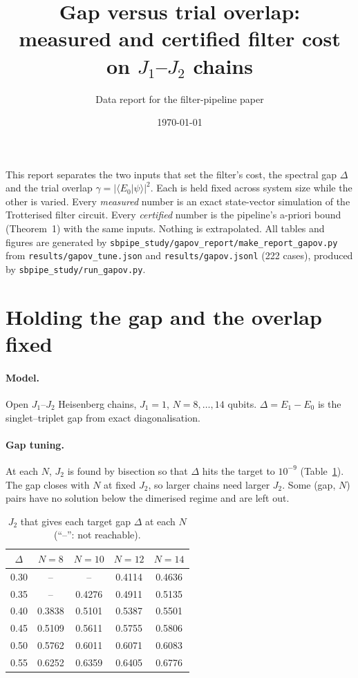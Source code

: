 \documentclass[10pt]{article}
\title{Gap versus trial overlap:\\ measured and certified filter cost on $J_1$--$J_2$ chains}
\author{Data report for the filter-pipeline paper}
\date{\today}
\begin{document}
\maketitle

\noindent This report separates the two inputs that set the filter's cost, the spectral gap $\Delta$ and the trial
overlap $\gamma=|\langle E_0|\psi\rangle|^2$. Each is held fixed across system size while the other is varied.
Every \emph{measured} number is an exact state-vector simulation of the Trotterised filter circuit. Every
\emph{certified} number is the pipeline's a-priori bound (Theorem~1) with the same inputs. Nothing is
extrapolated. All tables and figures are generated by \texttt{sbpipe\_study/gapov\_report/make\_report\_gapov.py}
from \texttt{results/gapov\_tune.json} and \texttt{results/gapov.jsonl} (222 cases), produced by
\texttt{sbpipe\_study/run\_gapov.py}.

\section{Holding the gap and the overlap fixed}

\paragraph{Model.} Open $J_1$--$J_2$ Heisenberg chains, $J_1=1$, $N=8,\dots,14$ qubits.
$\Delta=E_1-E_0$ is the singlet--triplet gap from exact diagonalisation.

\paragraph{Gap tuning.} At each $N$, $J_2$ is found by bisection so that $\Delta$ hits the target to $10^{-9}$
(Table~\ref{tab:tune}). The gap closes with $N$ at fixed $J_2$, so larger chains need larger $J_2$. Some
(gap, $N$) pairs have no solution below the dimerised regime and are left out.

\begin{table}[h]\centering\small
\caption{$J_2$ that gives each target gap $\Delta$ at each $N$ (``--'': not reachable).}\label{tab:tune}
\begin{tabular}{ccccc}\toprule
$\Delta$ & $N=8$ & $N=10$ & $N=12$ & $N=14$ \\\midrule
0.30 & -- & -- & 0.4114 & 0.4636 \\
0.35 & -- & 0.4276 & 0.4911 & 0.5135 \\
0.40 & 0.3838 & 0.5101 & 0.5387 & 0.5501 \\
0.45 & 0.5109 & 0.5611 & 0.5755 & 0.5806 \\
0.50 & 0.5762 & 0.6011 & 0.6071 & 0.6083 \\
0.55 & 0.6252 & 0.6359 & 0.6405 & 0.6776 \\
\bottomrule\end{tabular}
\end{table}
\end{document}
